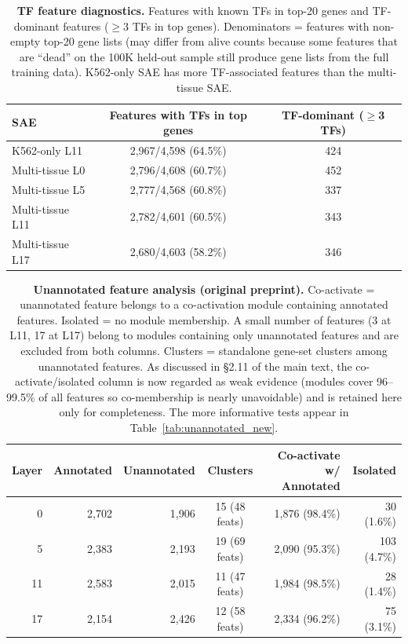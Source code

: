 \documentclass[onecolumn]{article}
\begin{document}
\begin{table}[H]
\centering
\caption{\textbf{TF feature diagnostics.} Features with known TFs in top-20 genes and TF-dominant features ($\geq$3 TFs in top genes). Denominators = features with non-empty top-20 gene lists (may differ from alive counts because some features that are ``dead'' on the 100K held-out sample still produce gene lists from the full training data). K562-only SAE has more TF-associated features than the multi-tissue SAE.}
\label{tab:tf_diagnostics}
\smallskip
\begin{tabular}{lcc}
\toprule
SAE & Features with TFs in top genes & TF-dominant ($\geq$3 TFs) \\
\midrule
K562-only L11     & 2,967/4,598 (64.5\%) & 424 \\
Multi-tissue L0   & 2,796/4,608 (60.7\%) & 452 \\
Multi-tissue L5   & 2,777/4,568 (60.8\%) & 337 \\
Multi-tissue L11  & 2,782/4,601 (60.5\%) & 343 \\
Multi-tissue L17  & 2,680/4,603 (58.2\%) & 346 \\
\bottomrule
\end{tabular}
\end{table}


\begin{table}[H]
\centering
\caption{\textbf{Unannotated feature analysis (original preprint).} Co-activate = unannotated feature belongs to a co-activation module containing annotated features. Isolated = no module membership. A small number of features (3 at L11, 17 at L17) belong to modules containing only unannotated features and are excluded from both columns. Clusters = standalone gene-set clusters among unannotated features. As discussed in \S2.11 of the main text, the co-activate/isolated column is now regarded as weak evidence (modules cover 96--99.5\% of all features so co-membership is nearly unavoidable) and is retained here only for completeness. The more informative tests appear in Table~\ref{tab:unannotated_new}.}
\label{tab:novel}
\smallskip
\begin{tabular}{rrrcrr}
\toprule
Layer & Annotated & Unannotated & Clusters & Co-activate w/ Annotated & Isolated \\
\midrule
0  & 2,702 & 1,906 & 15 (48 feats) & 1,876 (98.4\%) & 30 (1.6\%) \\
5  & 2,383 & 2,193 & 19 (69 feats) & 2,090 (95.3\%) & 103 (4.7\%) \\
11 & 2,583 & 2,015 & 11 (47 feats) & 1,984 (98.5\%) & 28 (1.4\%) \\
17 & 2,154 & 2,426 & 12 (58 feats) & 2,334 (96.2\%) & 75 (3.1\%) \\
\bottomrule
\end{tabular}
\end{table}
\end{document}
